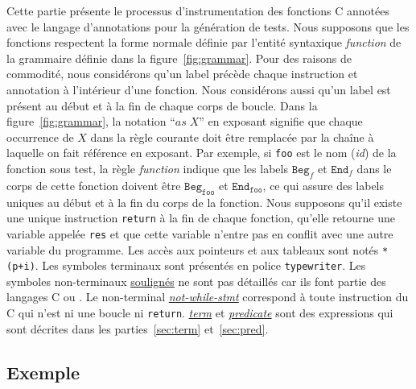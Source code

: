 Cette partie présente le processus d'instrumentation des fonctions C annotées
avec le langage d'annotations \eacsl pour la génération de tests.
Nous supposons que les fonctions respectent la forme normale définie par
l'entité syntaxique \textit{function} de la grammaire définie dans la
figure~\ref{fig:grammar}.
Pour des raisons de commodité, nous considérons qu'un label précède chaque
instruction et annotation à l'intérieur d'une fonction.
Nous considérons aussi qu'un label est présent au début et à la fin de chaque
corps de boucle.
Dans la figure~\ref{fig:grammar}, la notation ``${\textit{as}\;X}$'' en exposant
signifie que chaque occurrence de $X$ dans la règle courante doit être remplacée
par la chaîne à laquelle on fait référence en exposant.
Par exemple, si \texttt{foo} est le nom (\textit{id}) de la fonction sous test,
la règle \textit{function} indique que les labels $\texttt{Beg}_f$ et
$\texttt{End}_f$ dans le corps de cette fonction doivent être
$\texttt{Beg}_{\texttt{foo}}$ et $\texttt{End}_{\texttt{foo}}$, ce qui assure des
labels uniques au début et à la fin du corps de la fonction.
Nous supposons qu'il existe une unique instruction \lstinline'return' à la fin
de chaque fonction, qu'elle retourne une variable appelée \lstinline'res' et que
cette variable n'entre pas en conflit avec une autre variable du programme.
Les accès aux pointeurs et aux tableaux sont notés \lstinline|*(p+i)|.
Les symboles terminaux sont présentés en police \lstinline{typewriter}.
Les symboles non-terminaux \underline{soulignés} ne sont pas détaillés car ils
font partie des langages C ou \eacsl.
Le non-terminal \textit{\underline{not-while-stmt}} correspond à toute
instruction du C qui n'est ni une boucle ni \lstinline'return'.
\textit{\underline{term}} et \textit{\underline{predicate}} sont des expressions
\eacsl qui sont décrites dans les parties~\ref{sec:term} et~\ref{sec:pred}.


\subsection{Exemple}
\label{sec:translation-example}




